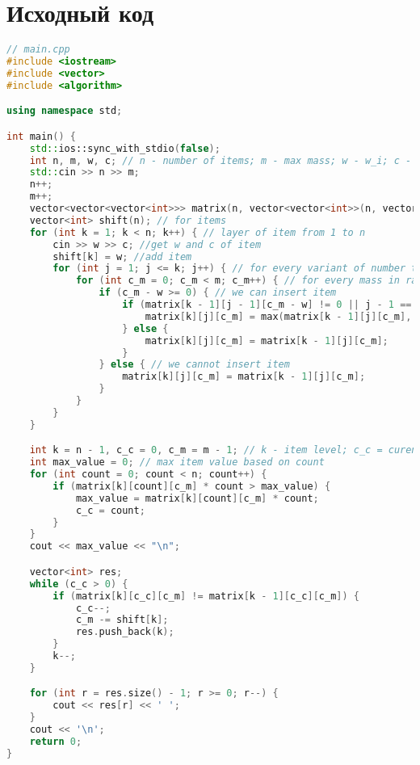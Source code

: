 \pagebreak

\section{Исходный код}

\begin{lstlisting}[language=C++]
// main.cpp
#include <iostream>
#include <vector>
#include <algorithm>

using namespace std;

int main() {
    std::ios::sync_with_stdio(false);
    int n, m, w, c; // n - number of items; m - max mass; w - w_i; c - c_i
    std::cin >> n >> m;
    n++;
    m++;
    vector<vector<vector<int>>> matrix(n, vector<vector<int>>(n, vector<int>(m, 0)));
    vector<int> shift(n); // for items
    for (int k = 1; k < n; k++) { // layer of item from 1 to n
        cin >> w >> c; //get w and c of item
        shift[k] = w; //add item
        for (int j = 1; j <= k; j++) { // for every variant of number to take
            for (int c_m = 0; c_m < m; c_m++) { // for every mass in range
                if (c_m - w >= 0) { // we can insert item
                    if (matrix[k - 1][j - 1][c_m - w] != 0 || j - 1 == 0) {
                        matrix[k][j][c_m] = max(matrix[k - 1][j][c_m], matrix[k - 1][j - 1][c_m - w] + c);
                    } else {
                        matrix[k][j][c_m] = matrix[k - 1][j][c_m];
                    }
                } else { // we cannot insert item
                    matrix[k][j][c_m] = matrix[k - 1][j][c_m];
                }
            }
        }
    }

    int k = n - 1, c_c = 0, c_m = m - 1; // k - item level; c_c = curent count; c_m - curent mass
    int max_value = 0; // max item value based on count
    for (int count = 0; count < n; count++) {
        if (matrix[k][count][c_m] * count > max_value) {
            max_value = matrix[k][count][c_m] * count;
            c_c = count;
        }
    }
    cout << max_value << "\n";

    vector<int> res;
    while (c_c > 0) {
        if (matrix[k][c_c][c_m] != matrix[k - 1][c_c][c_m]) {
            c_c--;
            c_m -= shift[k];
            res.push_back(k);
        }
        k--;
    }

    for (int r = res.size() - 1; r >= 0; r--) {
        cout << res[r] << ' ';
    }
    cout << '\n';
    return 0;
}
\end{lstlisting}

\lstset{language=[gnu] make}

